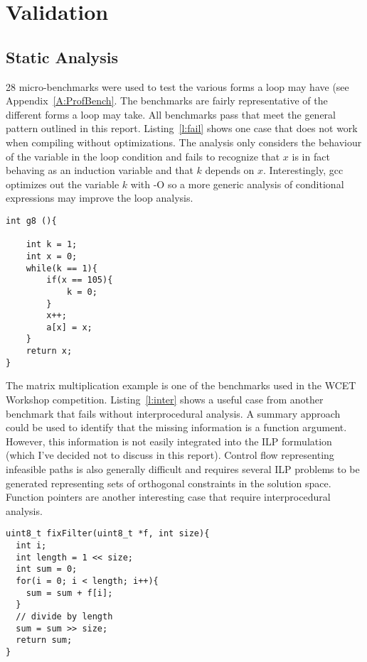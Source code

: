 

\section{Validation}
\subsection{Static Analysis}
28 micro-benchmarks were used to test the various forms a loop may have (see Appendix~\ref{A:ProfBench}. The benchmarks are fairly representative of the different forms a loop may take. All benchmarks pass that meet the general pattern outlined in this report. Listing~\ref{l:fail} shows one case that does not work when compiling without optimizations. The analysis only considers the behaviour of the variable in the loop condition and fails to recognize that $x$ is in fact behaving as an induction variable and that $k$ depends on $x$. Interestingly, gcc optimizes out the variable $k$ with -O so a more generic analysis of conditional expressions may improve the loop analysis.

\begin{lstlisting}[caption={Indirect test on induction variable fails.},label=l:fail]
int g8 (){

	int k = 1;
	int x = 0;
	while(k == 1){
		if(x == 105){
			k = 0;
		}
		x++;
		a[x] = x;
	}
	return x;
}
\end{lstlisting}

The matrix multiplication example is one of the benchmarks used in the WCET Workshop competition. Listing~\ref{l:inter} shows a useful case from another benchmark that fails without interprocedural analysis. A summary approach could be used to identify that the missing information is a function argument. However, this information is not easily integrated into the ILP formulation (which I've decided not to discuss in this report). Control flow representing infeasible paths is also generally difficult and requires several ILP problems to be generated representing sets of orthogonal constraints in the solution space. Function pointers are another interesting case that require interprocedural analysis.

\begin{lstlisting}[caption={Interprocedural analysis is necessary to analyze programs that call a function which takes the threshold as an argument.},label={l:inter}]
uint8_t fixFilter(uint8_t *f, int size){
  int i;
  int length = 1 << size;
  int sum = 0;
  for(i = 0; i < length; i++){
    sum = sum + f[i];	
  }   
  // divide by length
  sum = sum >> size;
  return sum;
}
\end{lstlisting}

